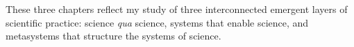 These three chapters reflect my study of three interconnected emergent layers of scientific practice: science \textit{qua} science, systems that enable science, and metasystems that structure the systems of science. 

\clearpage









\clearpage


